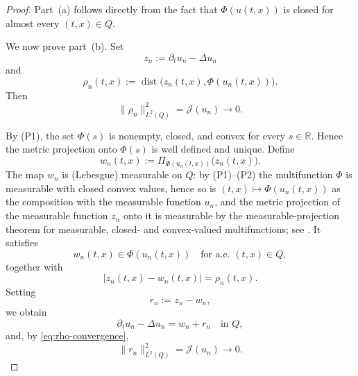 \documentclass[11pt]{elsarticle}
\theoremstyle{definition}
\theoremstyle{remark}
\numberwithin{equation}{section}
\begin{document}
	\begin{proof}
		Part~\textup{(a)} follows directly from the fact that
		$\Phi(u(t,x))$ is closed for almost every $(t,x)\in Q$. 
		
		We now prove part~\textup{(b)}. Set
		\[
		z_n:=\partial_tu_n-\Delta u_n
		\]
		and
		\[
		\rho_n(t,x)
		:=
		\operatorname{dist}
		\bigl(z_n(t,x),\Phi(u_n(t,x))\bigr).
		\]
		Then
		\begin{equation}
		\|\rho_n\|_{L^2(Q)}^2
		=
		\mathcal{J}(u_n)
		\longrightarrow 0.
		\label{eq:rho-convergence}
		\end{equation}
		
		By \textup{(P1)}, the set $\Phi(s)$ is nonempty, closed, and convex
		for every $s\in\mathbb{R}$. Hence the metric projection onto
		$\Phi(s)$ is well defined and unique. Define
		\[
		w_n(t,x)
		:=
		\Pi_{\Phi(u_n(t,x))}
		\bigl(z_n(t,x)\bigr).
		\]
		The map $w_n$ is (Lebesgue) measurable on $Q$: by \textup{(P1)}--\textup{(P2)} the multifunction $\Phi$ is measurable with closed convex values, hence so is $(t,x)\mapsto\Phi(u_n(t,x))$ as the composition with the measurable function $u_n$, and the metric projection of the measurable function $z_n$ onto it is measurable by the measurable-projection theorem for measurable, closed- and convex-valued multifunctions; see \cite[Theorem~8.2.11]{aubin_frankowska_2009}. It satisfies
		\[
		w_n(t,x)\in\Phi(u_n(t,x))
		\quad\text{for a.e. }(t,x)\in Q,
		\]
		together with
		\[
		|z_n(t,x)-w_n(t,x)|
		=
		\rho_n(t,x).
		\]
		Setting
		\[
		r_n:=z_n-w_n,
		\]
		we obtain
		\begin{equation}
		\partial_tu_n-\Delta u_n=w_n+r_n
		\quad\text{in }Q,
		\label{eq:pde-decomposition}
		\end{equation}
		and, by \eqref{eq:rho-convergence},
		\begin{equation}
		\|r_n\|_{L^2(Q)}^2
		=
		\mathcal{J}(u_n)
		\longrightarrow 0.
		\label{eq:rn-convergence}
		\end{equation}
		

\end{proof}
\end{document}
